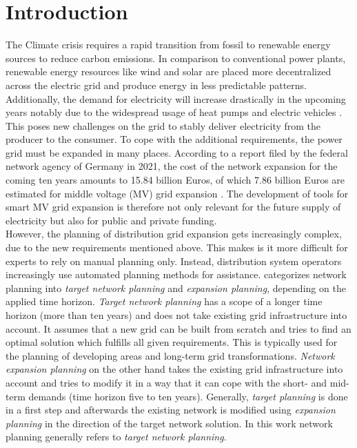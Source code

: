 \chapter{Introduction}\label{chap:introduction}

The Climate crisis requires a rapid transition from fossil to renewable energy sources to reduce carbon emissions. In comparison to conventional power plants, renewable energy resources like wind and solar are placed more decentralized across the electric grid and produce energy in less predictable patterns. Additionally, the demand for electricity will increase drastically in the upcoming years notably due to the widespread usage of heat pumps and electric vehicles \cite{brutto_stromverbrauch}. This poses new challenges on the grid to stably deliver electricity from the producer to the consumer. To cope with the additional requirements, the power grid must be expanded in many places. According to a report filed by the federal network agency of Germany in 2021, the cost of the network expansion for the coming ten years amounts to 15.84 billion Euros, of which 7.86 billion Euros are estimated for middle voltage (MV) grid expansion \cite{Ausbaubericht_2021_page14}. The development of tools for smart MV grid expansion is therefore not only relevant for the future supply of electricity but also for public and private funding. \\
However, the planning of distribution grid expansion gets increasingly complex, due to the new requirements mentioned above. This makes is it more difficult for experts to rely on manual planning only. Instead, distribution system operators increasingly use automated planning methods for assistance.
\cite{rotering2013zielnetzplanung} categorizes network planning into \textit{target network planning} and \textit{expansion planning}, depending on the applied time horizon. \textit{Target network planning} has a scope of a longer time horizon (more than ten years) and does not take existing grid infrastructure into account. It assumes that a new grid can be built from scratch and tries to find an optimal solution which fulfills all given requirements. This is typically used for the planning of developing areas and long-term grid transformations. \textit{Network expansion planning} on the other hand takes the existing grid infrastructure into account and tries to modify it in a way that it can cope with the short- and mid-term demands (time horizon five to ten years). Generally, \textit{target planning} is done in a first step and afterwards the existing network is modified using \textit{expansion planning} in the direction of the target network solution. In this work network planning generally refers to \textit{target network planning}.\\
